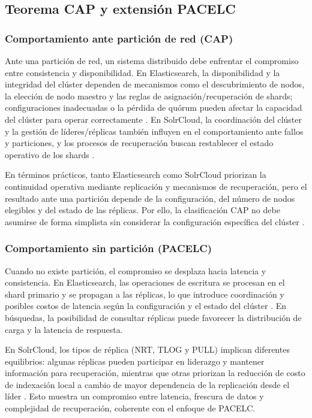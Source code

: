 \documentclass[12pt,a4paper]{article}
\begin{document}
\subsection{Teorema CAP y extensión PACELC}

\subsubsection{Comportamiento ante partición de red (CAP)}
Ante una partición de red, un sistema distribuido debe enfrentar el compromiso entre consistencia y disponibilidad. En Elasticsearch, la disponibilidad y la integridad del clúster dependen de mecanismos como el descubrimiento de nodos, la elección de nodo maestro y las reglas de asignación/recuperación de shards; configuraciones inadecuadas o la pérdida de quórum pueden afectar la capacidad del clúster para operar correctamente \cite{elastic_discovery,elastic_resilience}. En SolrCloud, la coordinación del clúster y la gestión de líderes/réplicas también influyen en el comportamiento ante fallos y particiones, y los procesos de recuperación buscan restablecer el estado operativo de los shards \cite{solr_shards_indexing,solr_recoveries,solr_distributed_requests}.

En términos prácticos, tanto Elasticsearch como SolrCloud priorizan la continuidad operativa mediante replicación y mecanismos de recuperación, pero el resultado ante una partición depende de la configuración, del número de nodos elegibles y del estado de las réplicas. Por ello, la clasificación CAP no debe asumirse de forma simplista sin considerar la configuración específica del clúster \cite{elastic_resilience,solr_recoveries}.

\subsubsection{Comportamiento sin partición (PACELC)}
Cuando no existe partición, el compromiso se desplaza hacia latencia y consistencia. En Elasticsearch, las operaciones de escritura se procesan en el shard primario y se propagan a las réplicas, lo que introduce coordinación y posibles costos de latencia según la configuración y el estado del clúster \cite{elastic_read_write,elastic_resilience}. En búsquedas, la posibilidad de consultar réplicas puede favorecer la distribución de carga y la latencia de respuesta.

En SolrCloud, los tipos de réplica (NRT, TLOG y PULL) implican diferentes equilibrios: algunas réplicas pueden participar en liderazgo y mantener información para recuperación, mientras que otras priorizan la reducción de costo de indexación local a cambio de mayor dependencia de la replicación desde el líder \cite{solr_shards_indexing,solr_recoveries}. Esto muestra un compromiso entre latencia, frescura de datos y complejidad de recuperación, coherente con el enfoque de PACELC.
\end{document}
